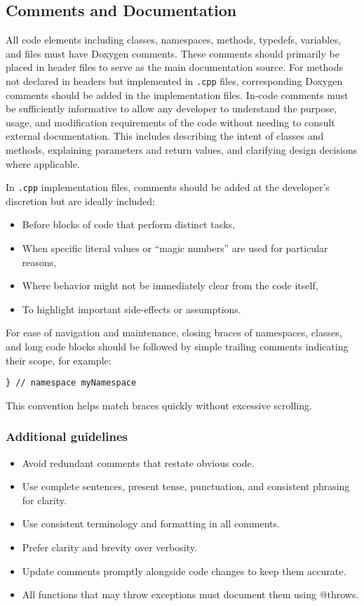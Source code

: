 \subsection{Comments and Documentation}

All code elements including classes, namespaces, methods, typedefs, variables, and files must have Doxygen comments. These comments should primarily be placed in header files to serve as the main documentation source. For methods not declared in headers but implemented in \texttt{.cpp} files, corresponding Doxygen comments should be added in the implementation files. In-code comments must be sufficiently informative to allow any developer to understand the purpose, usage, and modification requirements of the code without needing to consult external documentation. This includes describing the intent of classes and methods, explaining parameters and return values, and clarifying design decisions where applicable.

In \texttt{.cpp} implementation files, comments should be added at the developer’s discretion but are ideally included:
\begin{itemize}
    \item Before blocks of code that perform distinct tasks,
    \item When specific literal values or “magic numbers” are used for particular reasons,
    \item Where behavior might not be immediately clear from the code itself,
    \item To highlight important side-effects or assumptions.
\end{itemize}
For ease of navigation and maintenance, closing braces of namespaces, classes, and long code blocks should be followed by simple trailing comments indicating their scope, for example:
\begin{lstlisting}[style=cppstyle]
} // namespace myNamespace
\end{lstlisting}
This convention helps match braces quickly without excessive scrolling.

\subsubsection*{Additional guidelines}
\begin{itemize}
    \item Avoid redundant comments that restate obvious code.
    \item Use complete sentences, present tense, punctuation, and consistent phrasing for clarity.
    \item Use consistent terminology and formatting in all comments.
    \item Prefer clarity and brevity over verbosity.
    \item Update comments promptly alongside code changes to keep them accurate.
    \item All functions that may throw exceptions must document them using @throws. 
\end{itemize}

